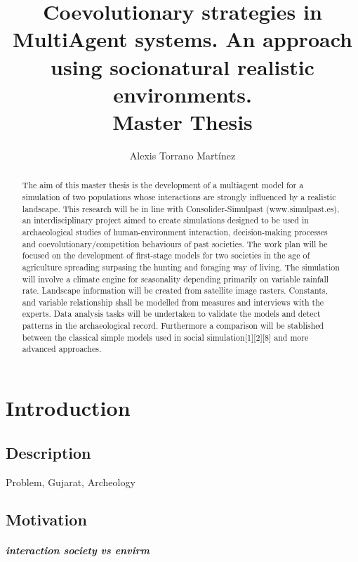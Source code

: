 \documentclass{report}
\begin{document}
\title{Coevolutionary strategies in MultiAgent systems. An approach using socionatural realistic environments.\\
\small{Master Thesis}}
\author{Alexis Torrano Mart\'inez}
\maketitle
\newpage

\begin{abstract}
The aim of this master thesis is the development of a multiagent model for a simulation  of two populations whose interactions are strongly influenced by a realistic landscape.
This research will be in line with Consolider-Simulpast (www.simulpast.es), an interdisciplinary project aimed to create simulations designed to be used in archaeological studies of human-environment interaction, decision-making processes and coevolutionary/competition behaviours of past societies.
The work plan will be focused on the development of first-stage models for two societies in the age of agriculture spreading surpasing the hunting and foraging way of living. The simulation will involve a climate engine for seasonality depending primarily on variable rainfall rate. Landscape information will be created from satellite image rasters. Constants, and variable relationship shall be modelled from measures and interviews with the experts. Data analysis tasks will be undertaken to validate the models and detect patterns in the archaeological record. Furthermore a comparison will be stablished between the classical simple models used in social simulation[1][2][8] and more advanced approaches.
\end{abstract}
\newpage 

\setcounter{tocdepth}{6}
\tableofcontents
\newpage 

\chapter{Introduction}

	\section{Description}
		Problem, Gujarat, Archeology
		
	\section{Motivation}
			\paragraph{interaction society vs envirm}
\end{document}
